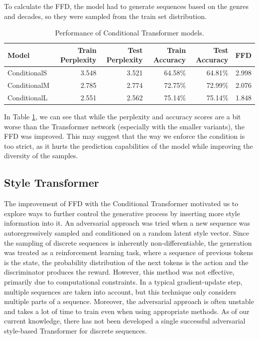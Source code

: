 \documentclass{article}
\begin{document}
To calculate the FFD, the model had to generate sequences based on the genres and decades, so they were sampled from the train set distribution.

\begin{table}[!htbp]
    \centering
    \begin{tabular}{lrrrrr}
        \toprule
        Model & Train Perplexity & Test Perplexity & Train Accuracy & Test Accuracy & FFD \\
        \midrule
        ConditionalS & 3.548 & 3.521 & 64.58\% & 64.81\% & 2.998 \\
        ConditionalM & 2.785 & 2.774 & 72.75\% & 72.99\% & 2.076 \\
        ConditionalL & 2.551 & 2.562 & 75.14\% & 75.14\% & 1.848 \\
        \bottomrule
    \end{tabular}
    \caption{Performance of Conditional Transformer models.}
    \label{tab:conditional_transformer_performance}
\end{table}

In Table \ref{tab:conditional_transformer_performance}, we can see that while the perplexity and accuracy scores are a bit worse than the Transformer network (especially with the smaller variants), the FFD was improved. This may suggest that the way we enforce the condition is too strict, as it hurts the prediction capabilities of the model while improving the diversity of the samples.

\subsection{Style Transformer} \label{Style Transformer}

The improvement of FFD with the Conditional Transformer motivated us to explore ways to further control the generative process by inserting more style information into it. An adversarial approach was tried when a new sequence was autoregressively sampled and conditioned on a random latent style vector. Since the sampling of discrete sequences is inherently non-differentiable, the generation was treated as a reinforcement learning task, where a sequence of previous tokens is the state, the probability distribution of the next tokens is the action and the discriminator produces the reward. However, this method was not effective, primarily due to computational constraints. In a typical gradient-update step, multiple sequences are taken into account, but this technique only considers multiple parts of a sequence. Moreover, the adversarial approach is often unstable and takes a lot of time to train even when using appropriate methods. As of our current knowledge, there has not been developed a single successful adversarial style-based Transformer for discrete sequences.
\end{document}
